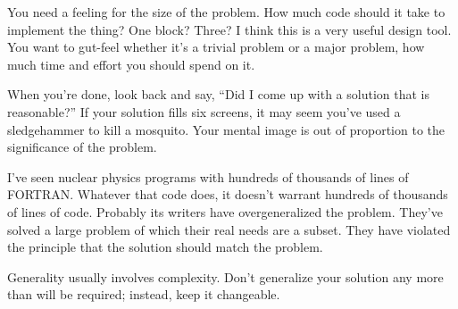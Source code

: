 \begin{tfquot}
You need a feeling for the size of the problem. How much code should
it take to implement the thing? One block? Three? I think this is a
very useful design tool. You want to gut-feel whether it's a trivial
problem or a major problem, how much time and effort you should spend
on it.

When you're done, look back and say, ``Did I come up with a solution
that is reasonable?'' If your solution fills six screens, it may seem
you've used a sledgehammer to kill a mosquito. Your mental image is
out of proportion to the significance of the problem.

I've seen nuclear physics programs with hundreds of thousands of lines
of FORTRAN. Whatever that code does, it doesn't warrant hundreds of
thousands of lines of code. Probably its writers have overgeneralized
the problem. They've solved a large problem of which their real needs
are a subset. They have violated the principle that the solution
should match the problem.
\end{tfquot}
\blackline{2ex}

\begin{tip}
Generality usually involves complexity. Don't generalize your solution any
more than will be required; instead, keep it changeable.
\end{tip}

